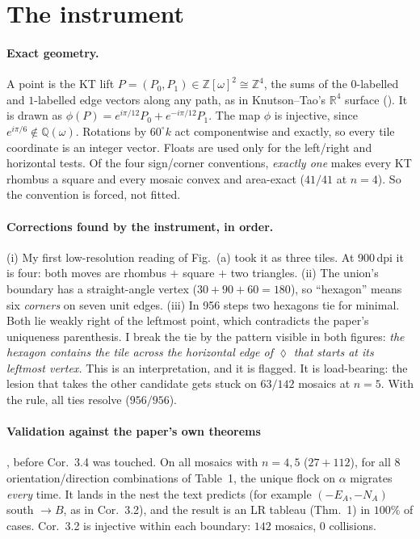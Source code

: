 \documentclass[11pt]{article}
\theoremstyle{definition}
\begin{document}
\section{The instrument}
\paragraph{Exact geometry.} A point is the KT lift $P=(P_0,P_1)\in\mathbb Z[\omega]^2\cong\mathbb Z^4$, the sums of the
$0$-labelled and $1$-labelled edge vectors along any path, as in Knutson--Tao's $\mathbb R^4$ surface (\cite[\S2.4]{P}).
It is drawn as $\phi(P)=e^{i\pi/12}P_0+e^{-i\pi/12}P_1$. The map $\phi$ is injective, since $e^{i\pi/6}\notin\mathbb Q(\omega)$.
Rotations by $60^\circ k$ act componentwise and exactly, so every tile coordinate is an integer vector. Floats are used
only for the left/right and horizontal tests. Of the four sign/corner conventions, \emph{exactly one} makes every KT
rhombus a square and every mosaic convex and area-exact ($41/41$ at $n=4$). So the convention is forced, not fitted.

\paragraph{Corrections found by the instrument, in order.} (i) My first low-resolution reading of Fig.~(a) took it as
three tiles. At 900\,dpi it is four: both moves are rhombus $+$ square $+$ two triangles. (ii) The union's boundary has a
straight-angle vertex ($30+90+60=180$), so ``hexagon'' means six \emph{corners} on seven unit edges. (iii) In 956
steps two hexagons tie for minimal. Both lie weakly right of the leftmost point, which contradicts the paper's uniqueness
parenthesis. I break the tie by the pattern visible in both figures: \emph{the hexagon contains the tile across the
horizontal edge of $\lozenge$ that starts at its leftmost vertex.} This is an interpretation, and it is flagged. It
is load-bearing: the lesion that takes the other candidate gets stuck on $63/142$ mosaics at $n=5$. With the rule,
all ties resolve ($956/956$).

\paragraph{Validation against the paper's own theorems}, before Cor.~3.4 was touched. On all mosaics with $n=4,5$
($27+112$), for all $8$ orientation/direction combinations of Table~1, the unique flock on $\alpha$ migrates
\emph{every} time. It lands in the nest the text predicts (for example $(-E_A,-N_A)$ south $\to B$, as in Cor.~3.2),
and the result is an LR tableau (Thm.~1) in $100\%$ of cases. Cor.~3.2 is injective within each boundary: $142$
mosaics, $0$ collisions.
\end{document}
